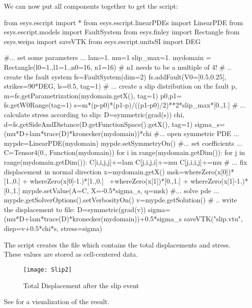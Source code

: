 We can now put all components together to get the script:
\begin{python}
  from esys.escript import *
  from esys.escript.linearPDEs import LinearPDE
  from esys.escript.models import FaultSystem
  from esys.finley import Rectangle
  from esys.weipa import saveVTK
  from esys.escript.unitsSI import DEG

  #... set some parameters ...
  lam=1.
  mu=1
  slip_max=1.
  mydomain = Rectangle(l0=1.,l1=1.,n0=16, n1=16)  # n1 needs to be a multiple of 4!
  # .. create the fault system
  fs=FaultSystem(dim=2)
  fs.addFault(V0=[0.5,0.25], strikes=90*DEG, ls=0.5, tag=1)
  # ... create a slip distribution on the fault
  p, m=fs.getParametrization(mydomain.getX(), tag=1)
  p0,p1= fs.getW0Range(tag=1)
  s=m*(p-p0)*(p1-p)/((p1-p0)/2)**2*slip_max*[0.,1.]
  # ... calculate stress according to slip:
  D=symmetric(grad(s))
  chi, d=fs.getSideAndDistance(D.getFunctionSpace().getX(), tag=1)
  sigma_s=(mu*D+lam*trace(D)*kronecker(mydomain))*chi
  #... open symmetric PDE ...
  mypde=LinearPDE(mydomain)
  mypde.setSymmetryOn()
  #... set coefficients ...
  C=Tensor4(0., Function(mydomain))
  for i in range(mydomain.getDim()):
    for j in range(mydomain.getDim()):
       C[i,i,j,j]+=lam
       C[j,i,j,i]+=mu
       C[j,i,i,j]+=mu
  # ... fix displacement in normal direction
  x=mydomain.getX()
  msk=whereZero(x[0])*[1.,0.] + whereZero(x[0]-1.)*[1.,0.] \
     +whereZero(x[1])*[0.,1.] + whereZero(x[1]-1.)*[0.,1.]
  mypde.setValue(A=C, X=-0.5*sigma_s, q=msk)
  #... solve pde ...
  mypde.getSolverOptions().setVerbosityOn()
  v=mypde.getSolution()
  # .. write the displacement to file:
  D=symmetric(grad(v))
  sigma=(mu*D+lam*trace(D)*kronecker(mydomain))+0.5*sigma_s
  saveVTK("slip.vtu", disp=v+0.5*chi*s, stress=sigma)
\end{python}
The script creates the file  which contains the total
displacements and stress.
These values are stored as cell-centered data.
%
\begin{figure} [ht]
\centerline{\texttt{[image: Slip2]}}
\caption{Total Displacement after the slip event}
\label{fig:slip.2}
\end{figure}
%
See  for a visualization of the result.


